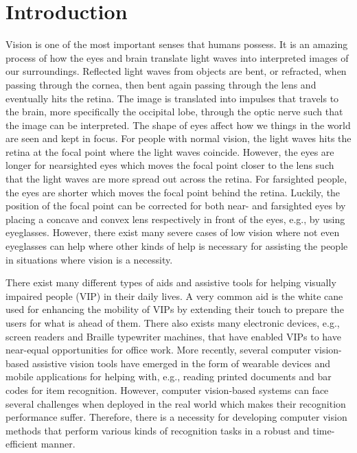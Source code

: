 
\chapter{Introduction}
\label{chap:introduction}

Vision is one of the most important senses that humans possess. It is an amazing process of how the eyes and brain translate light waves into interpreted images of our surroundings. Reflected light waves from objects are bent, or refracted, when passing through the cornea, then bent again passing through the lens and eventually hits the retina. The image is translated into impulses that travels to the brain, more specifically the occipital lobe, through the optic nerve such that the image can be interpreted. The shape of eyes affect how we things in the world are seen and kept in focus. For people with normal vision, the light waves hits the retina at the focal point where the light waves coincide. However, the eyes are longer for nearsighted eyes which moves the focal point closer to the lens such that the light waves are more spread out across the retina. For farsighted people, the eyes are shorter which moves the focal point behind the retina. Luckily, the position of the focal point can be corrected for both near- and farsighted eyes by placing a concave and convex lens respectively in front of the eyes, e.g., by using eyeglasses. However, there exist many severe cases of low vision where not even eyeglasses can help where other kinds of help is necessary for assisting the people in situations where vision is a necessity. 

There exist many different types of aids and assistive tools for helping visually impaired people (VIP) in their daily lives. A very common aid is the white cane used for enhancing the mobility of VIPs by extending their touch to prepare the users for what is ahead of them. There also exists many electronic devices, e.g., screen readers and Braille typewriter machines, that have enabled VIPs to have near-equal opportunities for office work. More recently, several computer vision-based assistive vision tools have emerged in the form of wearable devices and mobile applications for helping with, e.g., reading printed documents and bar codes for item recognition. However, computer vision-based systems can face several challenges when deployed in the real world which makes their recognition performance suffer. Therefore, there is a necessity for developing computer vision methods that perform various kinds of recognition tasks in a robust and time-efficient manner. 

